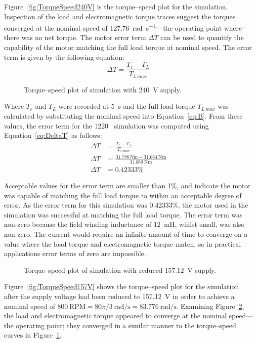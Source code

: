 \documentclass[a4paper,11pt,twocolumn]{article}
\newcommand{\s}{\si{\second}\xspace}
\newcommand{\V}{\si{\volt}\xspace}
\newcommand{\mH}{\si{\milli\henry}\xspace}
\newcommand{\Nm}{\si{\newton\metre}\xspace}
\newcommand{\rps}{\si{\radian\per\second}\xspace}
\newcommand{\RPM}{\text{RPM}\xspace}
\begin{document}
Figure~\vref{fig:TorqueSpeed240V} is the torque--speed plot for the simulation. 
Inspection of the load and electromagnetic torque traces suggest the torques 
converged at the nominal speed of 127.76~\rps---the operating point where there 
was no net torque. The motor error term $\Delta T$ can be used to quantify the 
capability of the motor matching the full load torque at nominal speed. The 
error term is given by the following equation:
\begin{equation} \label{eq:DeltaT}
    \Delta T = \frac{T_e - T_L}{T_{L\,max}}
\end{equation}
\begin{figure}[t]
    \centering
    \def\svgwidth{0.75\textwidth}
    
    \caption{Torque--speed plot of simulation with 240~\V supply.}
    \label{fig:TorqueSpeed240V}
\end{figure}

Where $T_e$ and $T_L$ were recorded at 5~\s and the full load torque 
$T_{L\,max}$ was calculated by substituting the nominal speed into 
Equation~\ref{eq:B}. From these values, the error term for the 1220~\RPM 
simulation was computed using Equation~\ref{eq:DeltaT} as follows:
\begin{align*}
    \Delta T &= \frac{T_e - T_L}{T_{L\,max}} \\
    \Delta T &= \frac{31.798~\Nm - 31.664~\Nm}{31.680~\Nm} \\
    \Delta T &= 0.42333\%
\end{align*}

Acceptable values for the error term are smaller than 1\%, and indicate the 
motor was capable of matching the full load torque to within an acceptable 
degree of error. As the error term for this simulation was 0.42333\%, the motor 
used in the simulation was successful at matching the full load torque. The 
error term was non-zero because the field winding inductance of 12~\mH, whilst 
small, was also non-zero. The current would require an infinite amount of time 
to converge on a value where the load torque and electromagnetic torque match, 
so in practical applications error terms of zero are impossible.
\begin{figure}[t]
    \centering
    \def\svgwidth{0.75\textwidth}
    
    \caption{Torque--speed plot of simulation with reduced 157.12~\V supply.}
    \label{fig:TorqueSpeed157V}
\end{figure}

Figure~\vref{fig:TorqueSpeed157V} shows the torque--speed plot for the 
simulation after the supply voltage had been reduced to 157.12~\V in order to 
achieve a nominal speed of $800~\RPM = 80\pi/3~\rps = 83.776~\rps$. Examining 
Figure~\ref{fig:TorqueSpeed157V}, the load and electromagnetic torque appeared 
to converge at the nominal speed---the operating point; they converged in a 
similar manner to the torque--speed curves in Figure~\ref{fig:TorqueSpeed240V}.
\end{document}
